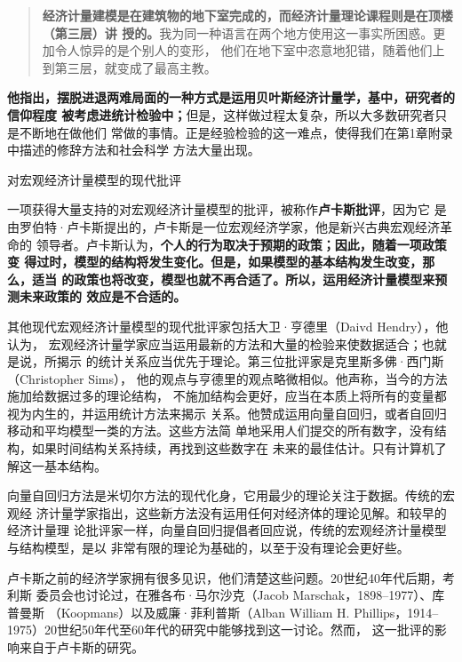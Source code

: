 \begin{quotation}
  \textbf{经济计量建模是在建筑物的地下室完成的，而经济计量理论课程则是在顶楼（第三层）讲
  授的。}我为同一种语言在两个地方使用这一事实所困惑。更加令人惊异的是个别人的变形，
  他们在地下室中恣意地犯错，随着他们上到第三层，就变成了最高主教。
\end{quotation}

\textbf{他指出，摆脱进退两难局面的一种方式是运用贝叶斯经济计量学，基中，研究者的信仰程度
被考虑进统计检验中；}但是，这样做过程太复杂，所以大多数研究者只是不断地在做他们
常做的事情。正是经验检验的这一难点，使得我们在第1章附录中描述的修辞方法和社会科学
方法大量出现。

\begin{mybox}{对宏观经济计量模型的现代批评}
  \begin{multicols}{2}

    一项获得大量支持的对宏观经济计量模型的批评，被称作\textbf{卢卡斯批评}，因为它
    是由罗伯特·卢卡斯提出的，卢卡斯是一位宏观经济学家，他是新兴古典宏观经济革命的
    领导者。卢卡斯认为，\textbf{个人的行为取决于预期的政策；因此，随着一项政策变
      得过时，模型的结构将发生变化。但是，如果模型的基本结构发生改变，那么，适当
      的政策也将改变，模型也就不再合适了。所以，运用经济计量模型来预测未来政策的
      效应是不合适的。}

    其他现代宏观经济计量模型的现代批评家包括大卫·亨德里（Daivd Hendry），他认为，
    宏观经济计量学家应当运用最新的方法和大量的检验来使数据适合；也就是说，所揭示
    的统计关系应当优先于理论。第三位批评家是克里斯多佛·西门斯（Christopher Sims），
    他的观点与亨德里的观点略微相似。他声称，当今的方法施加给数据过多的理论结构，
    不施加结构会更好，应当在本质上将所有的变量都视为内生的，并运用统计方法来揭示
    关系。他赞成运用向量自回归，或者自回归移动和平均模型一类的方法。这些方法简
    单地采用人们提交的所有数字，没有结构，如果时间结构关系持续，再找到这些数字在
    未来的最佳估计。只有计算机了解这一基本结构。

    向量自回归方法是米切尔方法的现代化身，它用最少的理论关注于数据。传统的宏观经
    济计量学家指出，这些新方法没有运用任何对经济体的理论见解。和较早的经济计量理
    论批评家一样，向量自回归提倡者回应说，传统的宏观经济计量模型与结构模型，是以
    非常有限的理论为基础的，以至于没有理论会更好些。


    卢卡斯之前的经济学家拥有很多见识，他们清楚这些问题。20世纪40年代后期，考利斯
    委员会也讨论过，在雅各布·马尔沙克（Jacob Marschak，1898--1977）、库普曼斯
    （Koopmans）以及威廉·菲利普斯（Alban William
    H. Phillips，1914--1975）20世纪50年代至60年代的研究中能够找到这一讨论。然而，
    这一批评的影响来自于卢卡斯的研究。
  \end{multicols}
\end{mybox}

